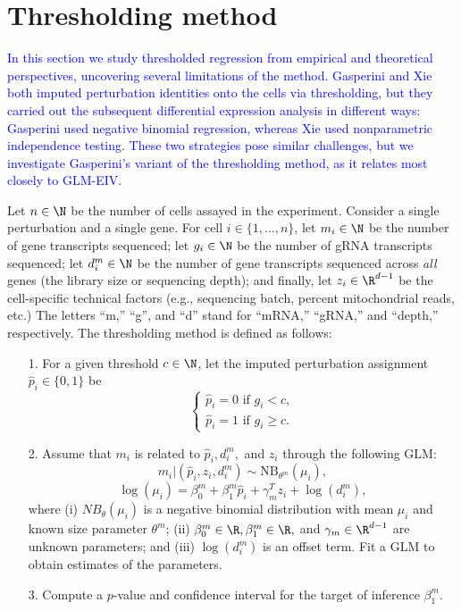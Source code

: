 \documentclass[12pt]{article}
\newcommand{\blue}[1]{\textcolor{blue}{#1}}
\begin{document}
\section{Thresholding method}
\blue{In this section we study thresholded regression from empirical and theoretical perspectives, uncovering several limitations of the method. Gasperini and Xie both imputed perturbation identities onto the cells via thresholding, but they carried out the subsequent differential expression analysis in different ways: Gasperini used negative binomial regression, whereas Xie used nonparametric independence testing. These two strategies pose similar challenges, but we investigate Gasperini's variant of the thresholding method, as it relates most closely to GLM-EIV.}

Let $n \in \N$ be the number of cells assayed in the experiment. Consider a single perturbation and a single gene. For cell $i \in \{1, \dots, n\}$, let $m_i \in \N$ be the number of gene transcripts sequenced; let $g_i \in \N$ be the number of gRNA transcripts sequenced; let $d^m_i \in \N$ be the number of gene transcripts sequenced across \textit{all} genes (the library size or sequencing depth); and finally, let $z_i \in \R^{d-1}$ be the cell-specific technical factors (e.g., sequencing batch, percent mitochondrial reads, etc.) The letters ``m,'' ``g'', and ``d'' stand for ``mRNA,'' ``gRNA,'' and ``depth,'' respectively. The thresholding method is defined as follows:
\begin{itemize}
\item[1.] For a given threshold $c \in \N$, let the imputed perturbation assignment $\hat{p}_i \in \{0, 1\}$ be $$\begin{cases} \hat{p}_i = 0 \textrm{ if } g_i < c, \\ \hat{p}_i = 1 \textrm{ if } g_i \geq c. \end{cases}$$
\item[2.] Assume that $m_i$ is related to $\hat{p}_i, d^m_i,$ and $z_i$ through the following GLM:
$$m_i | (\hat{p}_i, z_i, d^m_i) \sim \textrm{NB}_{\theta^m}(\mu_i),$$
\begin{equation}\label{thresh_glm}
\log(\mu_i) = \beta^m_0 + \beta^m_1 \hat{p}_i + \gamma^T_m z_i + \log\left(d_i^m\right),
\end{equation}
where (i) $NB_\theta(\mu_i)$ is a negative binomial distribution with mean $\mu_i$ and known size parameter $\theta^m$; (ii) $\beta^m_0 \in \R, \beta^m_1 \in \R,$ and $\gamma_m \in  \R^{d-1}$ are unknown parameters; and (iii) $\log(d_i^m)$ is an offset term. Fit a GLM to obtain estimates of the parameters.

\item[3.] Compute a $p$-value and confidence interval for the target of inference $\beta^m_1$.
\end{itemize}
\end{document}
